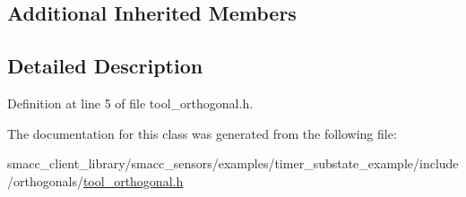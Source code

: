 \subsection*{Additional Inherited Members}


\subsection{Detailed Description}


Definition at line 5 of file tool\+\_\+orthogonal.\+h.



The documentation for this class was generated from the following file\+:\begin{DoxyCompactItemize}
\item 
smacc\+\_\+client\+\_\+library/smacc\+\_\+sensors/examples/timer\+\_\+substate\+\_\+example/include/orthogonals/\hyperlink{smacc__client__library_2smacc__sensors_2examples_2timer__substate__example_2include_2orthogonals_2tool__orthogonal_8h}{tool\+\_\+orthogonal.\+h}\end{DoxyCompactItemize}
